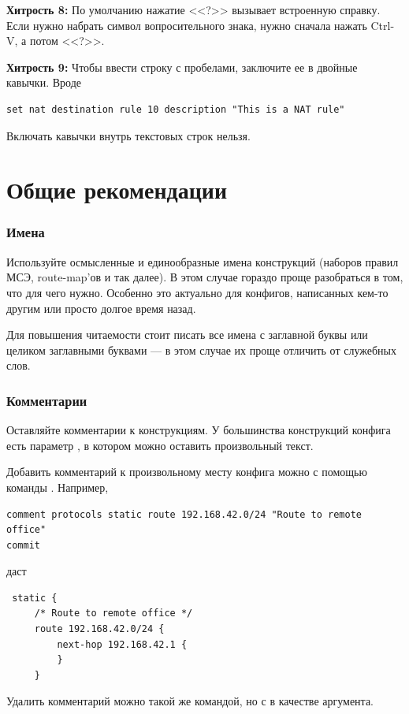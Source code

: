 \documentclass[a4paper,12pt, twoside, russian]{report}
\begin{document}
\par\noindent \textbf{Хитрость 8:} По умолчанию нажатие <<?>> вызывает встроенную справку. Если нужно набрать
символ вопросительного знака, нужно сначала нажать Ctrl-V, а потом <<?>>.

\par\noindent \textbf{Хитрость 9:} Чтобы ввести строку с пробелами, заключите ее в двойные кавычки. Вроде
\begin{verbatim}
set nat destination rule 10 description "This is a NAT rule"
\end{verbatim}

Включать кавычки внутрь текстовых строк нельзя.

\section{Общие рекомендации}

\subsubsection{Имена}
Используйте осмысленные и единообразные имена конструкций (наборов правил МСЭ, route-map'ов и так далее). В этом
случае гораздо проще разобраться в том, что для чего нужно. Особенно это актуально для конфигов, написанных 
кем-то другим или просто долгое время назад.

Для повышения читаемости стоит писать все имена с заглавной буквы или целиком заглавными буквами --- в этом
случае их проще отличить от служебных слов.

\subsubsection{Комментарии}
Оставляйте комментарии к конструкциям. У большинства конструкций конфига есть параметр ,
в котором можно оставить произвольный текст.

Добавить комментарий к произвольному месту конфига можно с помощью команды . Например,
\begin{verbatim}
comment protocols static route 192.168.42.0/24 "Route to remote office"
commit
\end{verbatim}
даст
\begin{verbatim}
 static {
     /* Route to remote office */
     route 192.168.42.0/24 {
         next-hop 192.168.42.1 {
         }
     }
\end{verbatim}
Удалить комментарий можно такой же командой, но с \verb ""  в качестве аргумента.
\end{document}
